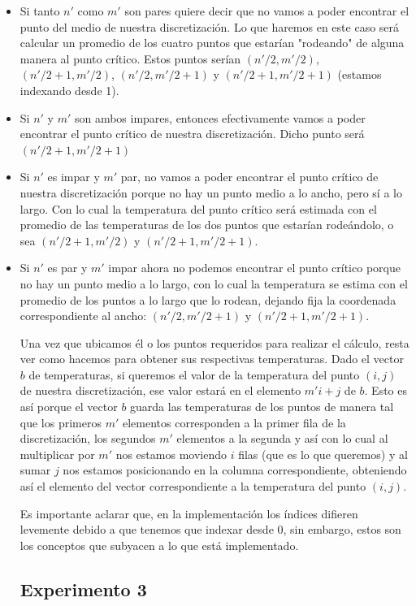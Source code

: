\begin{itemize}
\item Si tanto $n'$ como $m'$ son pares quiere decir que no vamos a poder encontrar el punto del medio de nuestra discretización. Lo que haremos en este caso será calcular un promedio de los cuatro puntos que estarían "rodeando" de alguna manera al punto crítico. Estos puntos serían $(n'/2, m'/2)$, $(n'/2 + 1, m'/2)$, $(n'/2, m'/2 + 1)$ y $(n'/2 + 1, m'/2 + 1)$ (estamos indexando desde 1).
\item Si $n'$ y $m'$ son ambos impares, entonces efectivamente vamos a poder encontrar el punto crítico de nuestra discretización. Dicho punto será $(n'/2 + 1, m'/2 + 1)$
\item Si $n'$ es impar y $m'$ par, no vamos a poder encontrar el punto crítico de nuestra discretización porque no hay un punto medio a lo ancho, pero sí a lo largo. Con lo cual la temperatura del punto crítico será estimada con el promedio de las temperaturas de los dos puntos que estarían rodeándolo, o sea $(n'/2 + 1, m'/2)$ y $(n'/2 +1, m'/2 + 1)$.
\item Si $n'$ es par y $m'$ impar ahora no podemos encontrar el punto crítico porque no hay un punto medio a lo largo, con lo cual la temperatura se estima con el promedio de los puntos a lo largo que lo rodean, dejando fija la coordenada correspondiente al ancho: $(n'/2, m'/2 + 1)$ y $(n'/2 + 1, m'/2 + 1)$.

Una vez que ubicamos él o los puntos requeridos para realizar el cálculo, resta ver como hacemos para obtener sus respectivas temperaturas. Dado el vector $b$ de temperaturas, si queremos el valor de la temperatura del punto $(i, j)$ de nuestra discretización, ese valor estará en el elemento $m'i + j$ de $b$. Esto es así porque el vector $b$ guarda las temperaturas de los puntos de manera tal que los primeros $m'$ elementos corresponden a la primer fila de la discretización, los segundos $m'$ elementos a la segunda y así con lo cual al multiplicar por $m'$ nos estamos moviendo $i$ filas (que es lo que queremos) y al sumar $j$ nos estamos posicionando en la columna correspondiente, obteniendo así el elemento del vector correspondiente a la temperatura del punto $(i, j)$.
\par Es importante aclarar que, en la implementación los índices difieren levemente debido a que tenemos que indexar desde 0, sin embargo, estos son los conceptos que subyacen a lo que está implementado.


\subsection{Experimento 3}


\end{itemize}
